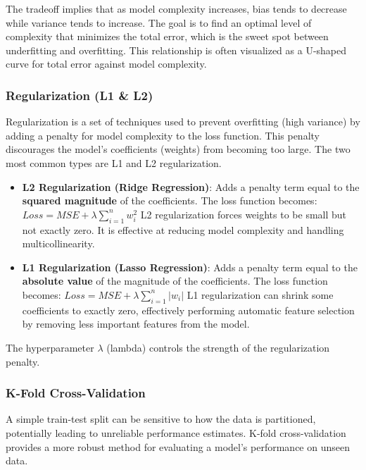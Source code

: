 \documentclass[11pt,a4paper]{article}
\begin{document}
The tradeoff implies that as model complexity increases, bias tends to decrease while variance tends to increase. The goal is to find an optimal level of complexity that minimizes the total error, which is the sweet spot between underfitting and overfitting. This relationship is often visualized as a U-shaped curve for total error against model complexity.

\subsubsection{Regularization (L1 \& L2)}

Regularization is a set of techniques used to prevent overfitting (high variance) by adding a penalty for model complexity to the loss function. This penalty discourages the model's coefficients (weights) from becoming too large. The two most common types are L1 and L2 regularization.
\begin{itemize}
    \item \textbf{L2 Regularization (Ridge Regression)}: Adds a penalty term equal to the \textbf{squared magnitude} of the coefficients. The loss function becomes:
    $Loss = MSE + \lambda \sum_{i=1}^{n} w_i^2$
    L2 regularization forces weights to be small but not exactly zero. It is effective at reducing model complexity and handling multicollinearity.

    \item \textbf{L1 Regularization (Lasso Regression)}: Adds a penalty term equal to the \textbf{absolute value} of the magnitude of the coefficients. The loss function becomes:
    $Loss = MSE + \lambda \sum_{i=1}^{n} |w_i|$
    L1 regularization can shrink some coefficients to exactly zero, effectively performing automatic feature selection by removing less important features from the model.
\end{itemize}

The hyperparameter $\lambda$ (lambda) controls the strength of the regularization penalty.

\subsubsection{K-Fold Cross-Validation}

A simple train-test split can be sensitive to how the data is partitioned, potentially leading to unreliable performance estimates. K-fold cross-validation provides a more robust method for evaluating a model's performance on unseen data.
\end{document}

